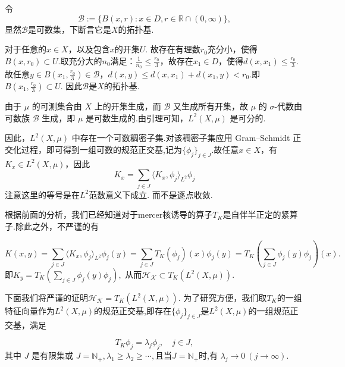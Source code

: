 \documentclass[12pt, a4paper, oneside]{ctexbook}
\begin{document}
令
\begin{equation*}
    \mathcal{B}:=\{B(x,r):x\in D,r\in\mathbb{R}\cap (0,\infty)\},
\end{equation*}
显然$\mathcal{B}$是可数集，下断言它是$X$的拓扑基.

对于任意的$x\in X$，以及包含$x$的开集$U$. 故存在有理数$r_0$充分小，使得$B(x,r_0)\subset U$.取充分大的$n_0$满足：$\frac{1}{n_0}\leq \frac{r_0}{3}$，故存在$x_1\in D$，使得$d(x,x_1)\leq \frac{r_0}{3}$.故任意$y\in B(x_1,\frac{r_0}{3})\in\mathcal{B}$，$d(x,y)\leq d(x,x_1)+d(x_1,y)<r_0.$即$B(x_1,\frac{r_0}{3})\subset U$. 因此$\mathcal{B}$是$X$的拓扑基.

由于 $\mu$ 的可测集合由 $X$ 上的开集生成，而 $\mathcal{B}$ 又生成所有开集，故 $\mu$ 的 $\sigma$-代数由可数族 $\mathcal{B}$ 生成，即 $\mu$ 是可数生成的.由引理可知，$L^2(X,\mu)$ 是可分的.

因此，$L^2(X,\mu)$ 中存在一个可数稠密子集.对该稠密子集应用 Gram--Schmidt 正交化过程，即可得到一组可数的规范正交基,记为$\{\phi_j\}_{j\in J}$.故任意$x\in X$，有$K_x\in L^2(X,\mu)$，因此
\begin{equation*}
    K_x=\sum_{j\in J} \langle K_x,\phi_j\rangle_{L^2}\phi_{j}
\end{equation*}
注意这里的等号是在$L^2$范数意义下成立. 而不是逐点收敛.


根据前面的分析，我们已经知道对于mercer核诱导的算子$T_K$是自伴半正定的紧算子.除此之外，不严谨的有

\begin{equation*}
    K(x,y)=\sum_{j\in J}\langle K_x,\phi_j\rangle_{L^2} \phi_j(y)=\sum_{j\in J}T_K(\phi_j)(x)\phi_j(y)=T_K\left(\sum_{j\in J}\phi_j(y) \phi_j\right)(x).
\end{equation*}
即$K_y=T_K\left(\sum_{j\in J}\phi_j(y) \phi_j\right),$ 从而$\mathcal{H_K}\subset T_K\left(L^2(X,\mu)\right)$.


下面我们将严谨的证明$\mathcal{H_K}= T_K\left(L^2(X,\mu)\right)$. 为了研究方便，我们取$T_K$的一组特征向量作为$L^2(X,\mu)$的规范正交基,即存在$\{\phi_j\}_{j\in J}$是$L^2(X,\mu)$的一组规范正交基，满足

$$T_K\phi_j=\lambda_j\phi_j,\quad j\in J,$$
其中 $J$ 是有限集或 $J=\mathbb{N}_+,\lambda_1\geq\lambda_2\geq\cdots,$且当$J=\mathbb{N}_+$时,有 $\lambda_j\to0~(j\to\infty).$
\end{document}
